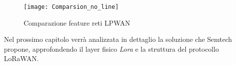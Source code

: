 \begin{figure}[ht]
    \centering 
                \texttt{[image: Comparsion\_no\_line]}
    \caption{Comparazione feature reti LPWAN}
    \label{fig:feature_comp} 
\end{figure}

Nel prossimo capitolo verrà analizzata in dettaglio la soluzione che Semtech
propone, approfondendo il layer fisico \emph{Lora} e la struttura del protocollo
LoRaWAN.
